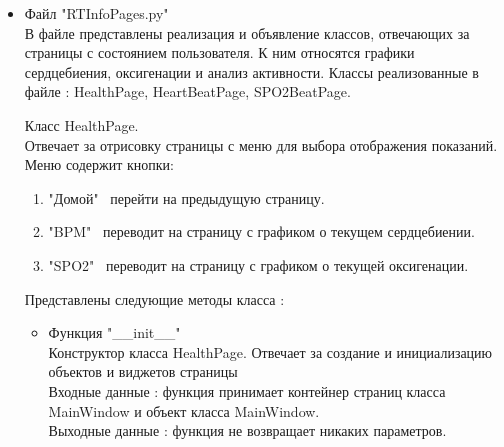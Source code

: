 \documentclass[a4document]{article}
\begin{document}
{\begin{itemize}
\begin{itemize}
        \end{itemize}
    
    \item Файл "RTInfoPages.py" \\
        В файле представлены реализация и объявление классов, отвечающих за страницы с состоянием пользователя. 
        К ним относятся графики сердцебиения, оксигенации и анализ активности.
        Классы реализованные в файле : HealthPage, HeartBeatPage, SPO2BeatPage.
        \bigbreak
        
        Класс HealthPage.\\
        Отвечает за отрисовку страницы с меню для выбора отображения показаний.
        Меню содержит кнопки:
        \begin{enumerate}
            \item "Домой" \  перейти на предыдущую страницу.
            \item "BPM" \  переводит на страницу с графиком о текущем сердцебиении.
            \item "SPO2" \  переводит на страницу с графиком о текущей оксигенации.
        \end{enumerate}
        
        Представлены следующие методы класса :
        \begin{itemize}
            \item Функция "\_\_init\_\_" \\
                Конструктор класса HealthPage. Отвечает за создание и инициализацию объектов и виджетов страницы \\
                Входные данные : функция принимает контейнер страниц класса \\MainWindow и объект класса MainWindow.\\
                Выходные данные : функция не возвращает никаких параметров.
        \end{itemize}
        

\end{itemize}}
\end{document}

